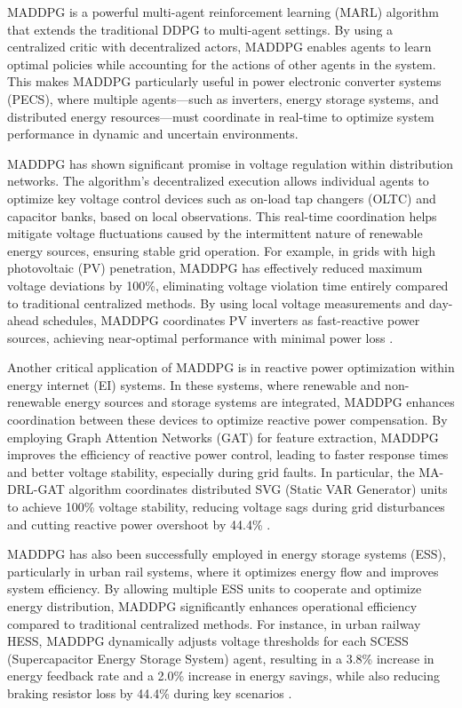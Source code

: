 MADDPG is a powerful multi-agent reinforcement learning (MARL) algorithm that extends the traditional DDPG to multi-agent settings. By using a centralized critic with decentralized actors, MADDPG enables agents to learn optimal policies while accounting for the actions of other agents in the system. This makes MADDPG particularly useful in power electronic converter systems (PECS), where multiple agents—such as inverters, energy storage systems, and distributed energy resources—must coordinate in real-time to optimize system performance in dynamic and uncertain environments.

MADDPG has shown significant promise in voltage regulation within distribution networks. The algorithm's decentralized execution allows individual agents to optimize key voltage control devices such as on-load tap changers (OLTC) and capacitor banks, based on local observations. This real-time coordination helps mitigate voltage fluctuations caused by the intermittent nature of renewable energy sources, ensuring stable grid operation. For example, in grids with high photovoltaic (PV) penetration, MADDPG has effectively reduced maximum voltage deviations by 100\%, eliminating voltage violation time entirely compared to traditional centralized methods. By using local voltage measurements and day-ahead schedules, MADDPG coordinates PV inverters as fast-reactive power sources, achieving near-optimal performance with minimal power loss \cite{sun2021two}.

Another critical application of MADDPG is in reactive power optimization within energy internet (EI) systems. In these systems, where renewable and non-renewable energy sources and storage systems are integrated, MADDPG enhances coordination between these devices to optimize reactive power compensation. By employing Graph Attention Networks (GAT) for feature extraction, MADDPG improves the efficiency of reactive power control, leading to faster response times and better voltage stability, especially during grid faults. In particular, the MA-DRL-GAT algorithm coordinates distributed SVG (Static VAR Generator) units to achieve 100\% voltage stability, reducing voltage sags during grid disturbances and cutting reactive power overshoot by 44.4\% \cite{xu2024distributed}.

MADDPG has also been successfully employed in energy storage systems (ESS), particularly in urban rail systems, where it optimizes energy flow and improves system efficiency. By allowing multiple ESS units to cooperate and optimize energy distribution, MADDPG significantly enhances operational efficiency compared to traditional centralized methods. For instance, in urban railway HESS, MADDPG dynamically adjusts voltage thresholds for each SCESS (Supercapacitor Energy Storage System) agent, resulting in a 3.8\% increase in energy feedback rate and a 2.0\% increase in energy savings, while also reducing braking resistor loss by 44.4\% during key scenarios \cite{zhu2020decentralized}.

